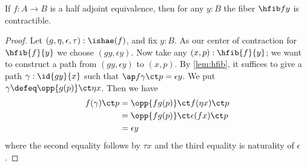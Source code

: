 %
\begin{thm}\label{thm:contr-hae}
  If $f:A\to B$ is a half adjoint equivalence, then for any $y:B$ the fiber $\hfib f y$ is contractible.
\end{thm}

\begin{proof}
  Let $(g,\eta,\epsilon,\tau) : \ishae(f)$, and fix $y : B$.
  As our center of contraction for $\hfib{f}{y}$ we choose $(gy, \epsilon y)$.
  Now take any $(x,p) : \hfib{f}{y}$; we want to construct a path from $(gy, \epsilon y)$ to $(x,p)$.
  By \cref{lem:hfib}, it suffices to give a path $\gamma : \id{gy}{x}$ such that $\ap f\gamma \ct p = \epsilon y$.
  We put $\gamma \defeq \opp{g(p)} \ct \eta x$.
  Then we have
  \begin{align*}
    f(\gamma) \ct p & = \opp{fg(p)} \ct f (\eta x) \ct p \\
    & = \opp{fg(p)} \ct \epsilon(fx) \ct p \\
    & = \epsilon y
  \end{align*}
  where the second equality follows by $\tau x$ and the third equality is naturality of $\epsilon$.
\end{proof}
